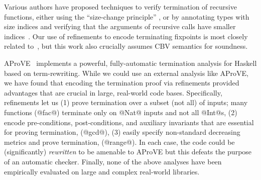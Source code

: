 Various authors have proposed techniques to verify termination 
of recursive functions, either using the ``size-change principle'' 
\cite{JonesB04,Sereni05}, or by annotating types with size indices 
and verifying that the arguments of recursive calls have smaller 
indices~\cite{HughesParetoSabry96,BartheTermination}.
%
Our use of refinements to encode terminating fixpoints is most 
closely related to~\cite{XiTerminationLICS01}, but this work 
also crucially assumes CBV semantics for soundness.

AProVE~\cite{Giesl11} implements a powerful, fully-automatic
termination analysis for Haskell based on term-rewriting.
%
While we could use an external analysis like AProVE,
we have found that encoding the termination proof via 
refinements provided advantages that are crucial in 
large, real-world code bases. Specifically, refinements
let us
%
(1) prove termination over a subset 
    (not all) of inputs; many functions (\eg @fac@) 
    terminate only on @Nat@ inputs and not all @Int@s,
%
(2) encode pre-conditions, 
    post-conditions, and auxiliary invariants that 
    are essential for proving termination, (\eg @gcd@),
%
(3) easily specify non-standard 
    decreasing metrics and prove termination, (\eg @range@).
%
In each case, the code could be (significantly) 
\emph{rewritten} to be amenable to AProVE but this defeats
the purpose of an automatic checker.
%
Finally, none of the above analyses have been empirically
evaluated on large and complex real-world libraries.




